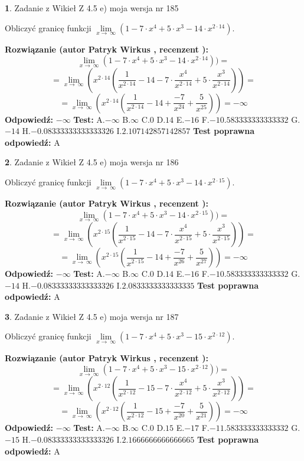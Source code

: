 \documentclass[12pt, a4paper]{article}
\theoremstyle{definition} %
\newtheorem{zad}{}
\newcommand{\zadStart}[1]{\begin{zad}#1\newline}
\newcommand{\zadStop}{\end{zad}}
\newcommand{\rozwStart}[2]{\noindent \textbf{Rozwiązanie (autor #1 , recenzent #2): }\newline}
\newcommand{\rozwStop}{\newline}
\newcommand{\odpStart}{\noindent \textbf{Odpowiedź:}\newline}
\newcommand{\odpStop}{\newline}
\newcommand{\testStart}{\noindent \textbf{Test:}\newline}
\newcommand{\testStop}{\newline}
\newcommand{\kluczStart}{\noindent \textbf{Test poprawna odpowiedź:}\newline}
\newcommand{\kluczStop}{\newline}
\begin{document}
\zadStart{Zadanie z Wikieł Z 4.5 e) moja wersja nr 185}


Obliczyć granicę funkcji  $\lim\limits_{x\to\ \infty}(1 - 7 \cdot x^{4}+5 \cdot x^{3}- 14 \cdot x^{2\cdot14})$.
\zadStop
\rozwStart{Patryk Wirkus}{}
$$\lim\limits_{x\to\ \infty}(1 - 7 \cdot x^{4}+5 \cdot x^{3}- 14 \cdot x^{2\cdot14}))=$$
$$=\lim\limits_{x\to\ \infty}(x^{2\cdot14}(\frac{1}{x^{2\cdot14}}-14 -7 \cdot \frac{x^{4}}{x^{2\cdot14}}+5 \cdot \frac{x^{3}}{x^{2\cdot14}}))=$$
$$=\lim\limits_{x\to\ \infty}(x^{2\cdot14}(\frac{1}{x^{2\cdot14}}-14 + \frac{-7}{x^{24}}+ \frac{5}{x^{25}}))=-\infty$$
\rozwStop
\odpStart
$-\infty$
\odpStop
\testStart
A.$-\infty$ B.$\infty$ C.$0$ D.$14$ E.$-16$
F.$-10.583333333333332$ G.$-14$
H.$-0.08333333333333326$
I.$2.107142857142857$
\testStop
\kluczStart
A
\kluczStop



\zadStart{Zadanie z Wikieł Z 4.5 e) moja wersja nr 186}


Obliczyć granicę funkcji  $\lim\limits_{x\to\ \infty}(1 - 7 \cdot x^{4}+5 \cdot x^{3}- 14 \cdot x^{2\cdot15})$.
\zadStop
\rozwStart{Patryk Wirkus}{}
$$\lim\limits_{x\to\ \infty}(1 - 7 \cdot x^{4}+5 \cdot x^{3}- 14 \cdot x^{2\cdot15}))=$$
$$=\lim\limits_{x\to\ \infty}(x^{2\cdot15}(\frac{1}{x^{2\cdot15}}-14 -7 \cdot \frac{x^{4}}{x^{2\cdot15}}+5 \cdot \frac{x^{3}}{x^{2\cdot15}}))=$$
$$=\lim\limits_{x\to\ \infty}(x^{2\cdot15}(\frac{1}{x^{2\cdot15}}-14 + \frac{-7}{x^{26}}+ \frac{5}{x^{27}}))=-\infty$$
\rozwStop
\odpStart
$-\infty$
\odpStop
\testStart
A.$-\infty$ B.$\infty$ C.$0$ D.$14$ E.$-16$
F.$-10.583333333333332$ G.$-14$
H.$-0.08333333333333326$
I.$2.0833333333333335$
\testStop
\kluczStart
A
\kluczStop



\zadStart{Zadanie z Wikieł Z 4.5 e) moja wersja nr 187}


Obliczyć granicę funkcji  $\lim\limits_{x\to\ \infty}(1 - 7 \cdot x^{4}+5 \cdot x^{3}- 15 \cdot x^{2\cdot12})$.
\zadStop
\rozwStart{Patryk Wirkus}{}
$$\lim\limits_{x\to\ \infty}(1 - 7 \cdot x^{4}+5 \cdot x^{3}- 15 \cdot x^{2\cdot12}))=$$
$$=\lim\limits_{x\to\ \infty}(x^{2\cdot12}(\frac{1}{x^{2\cdot12}}-15 -7 \cdot \frac{x^{4}}{x^{2\cdot12}}+5 \cdot \frac{x^{3}}{x^{2\cdot12}}))=$$
$$=\lim\limits_{x\to\ \infty}(x^{2\cdot12}(\frac{1}{x^{2\cdot12}}-15 + \frac{-7}{x^{20}}+ \frac{5}{x^{21}}))=-\infty$$
\rozwStop
\odpStart
$-\infty$
\odpStop
\testStart
A.$-\infty$ B.$\infty$ C.$0$ D.$15$ E.$-17$
F.$-11.583333333333332$ G.$-15$
H.$-0.08333333333333326$
I.$2.1666666666666665$
\testStop
\kluczStart
A
\kluczStop
\end{document}

